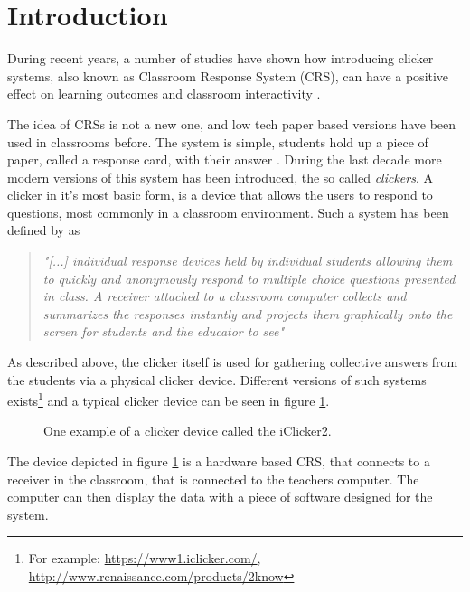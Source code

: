 \section{Introduction}
During recent years, a number of studies have shown how introducing clicker systems, also known as Classroom Response System (CRS), can have a positive effect on learning outcomes and classroom interactivity \cite{yourstone2008classroom, siau2006use, lantz2014effectiveness}.

The idea of CRSs is not a new one, and low tech paper based versions have been used in classrooms before. The system is simple, students hold up a piece of paper, called a response card, with their answer \cite{ralph1994effects}. During the last decade more modern versions of this system has been introduced, the so called \emph{clickers}. A clicker in it's most basic form, is a device that allows the users to respond to questions, most commonly in a classroom environment. Such a system has been defined by  as 

\begin{quote}
    \emph{"[...] individual response devices held by individual students allowing them to quickly and anonymously respond to multiple choice questions presented in class. A receiver attached to a classroom computer collects and summarizes the responses instantly and projects them graphically onto the screen for students and the educator to see"} \cite[p.~280]{lantz2014effectiveness}
\end{quote}

As described above, the clicker itself is used for gathering collective answers from the students via a physical clicker device. Different versions of such systems exists\footnote{For example: \url{https://www1.iclicker.com/}, \url{http://www.renaissance.com/products/2know}} and a typical clicker device can be seen in figure \ref{fig:iclicker}.

\begin{figure}[H]
\capstart
	\centering
	\caption[iClicker2]{One example of a clicker device called the iClicker2.}\label{fig:iclicker}
\end{figure}

The device depicted in figure \ref{fig:iclicker} is a hardware based CRS, that connects to a receiver in the classroom, that is connected to the teachers computer. The computer can then display the data with a piece of software designed for the system.

